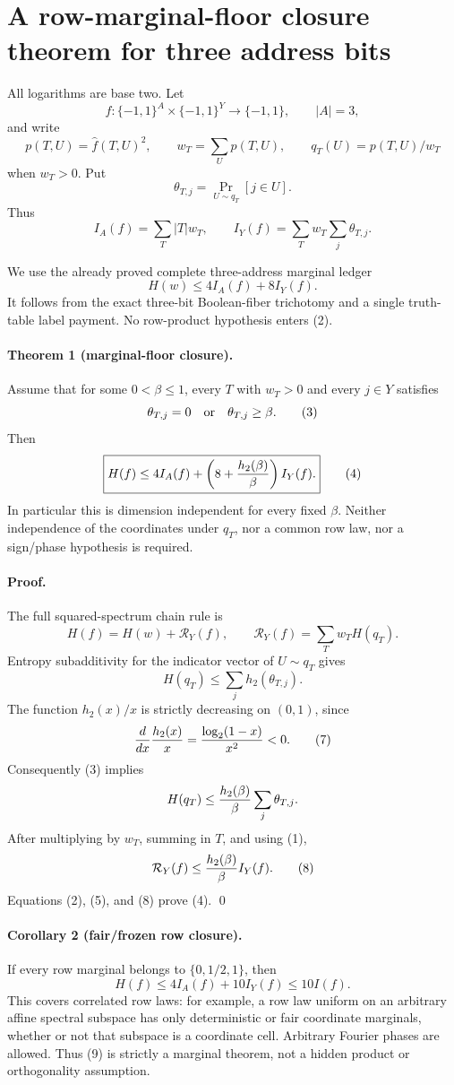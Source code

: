 \section*{A row-marginal-floor closure theorem for three address bits}

All logarithms are base two.  Let
\[
 f:\{-1,1\}^{A}\times\{-1,1\}^{Y}\to\{-1,1\},\qquad |A|=3,
\]
and write
\[
 p(T,U)=\widehat f(T,U)^2,\qquad
 w_T=\sum_U p(T,U),\qquad q_T(U)=p(T,U)/w_T
\]
when $w_T>0$.  Put
\[
 \theta_{T,j}=\Pr_{U\sim q_T}[j\in U].
\]
Thus
\[
 I_A(f)=\sum_T|T|w_T,
 \qquad I_Y(f)=\sum_Tw_T\sum_j\theta_{T,j}.             \tag{1}
\]

We use the already proved complete three-address marginal ledger
\[
 H(w)\le 4I_A(f)+8I_Y(f).                               \tag{2}
\]
It follows from the exact three-bit Boolean-fiber trichotomy and a single
truth-table label payment.  No row-product hypothesis enters (2).

\paragraph{Theorem 1 (marginal-floor closure).}
Assume that for some $0<\beta\le1$, every $T$ with $w_T>0$ and every
$j\in Y$ satisfies
\[
 \theta_{T,j}=0\quad\hbox{or}\quad \theta_{T,j}\ge\beta. \tag{3}
\]
Then
\[
 \boxed{
 H(f)\le4I_A(f)+\left(8+{h_2(\beta)\over\beta}\right)I_Y(f).} \tag{4}
\]
In particular this is dimension independent for every fixed $\beta$.
Neither independence of the coordinates under $q_T$, nor a common row law,
nor a sign/phase hypothesis is required.

\paragraph{Proof.}
The full squared-spectrum chain rule is
\[
 H(f)=H(w)+\mathcal R_Y(f),\qquad
 \mathcal R_Y(f)=\sum_Tw_TH(q_T).                        \tag{5}
\]
Entropy subadditivity for the indicator vector of $U\sim q_T$ gives
\[
 H(q_T)\le\sum_j h_2(\theta_{T,j}).                      \tag{6}
\]
The function $h_2(x)/x$ is strictly decreasing on $(0,1)$, since
\[
 {d\over dx}{h_2(x)\over x}={\log_2(1-x)\over x^2}<0.  \tag{7}
\]
Consequently (3) implies
\[
 H(q_T)\le {h_2(\beta)\over\beta}\sum_j\theta_{T,j}.
\]
After multiplying by $w_T$, summing in $T$, and using (1),
\[
 \mathcal R_Y(f)\le {h_2(\beta)\over\beta}I_Y(f).       \tag{8}
\]
Equations (2), (5), and (8) prove (4). \qed

\paragraph{Corollary 2 (fair/frozen row closure).}
If every row marginal belongs to $\{0,1/2,1\}$, then
\[
 \boxed{H(f)\le4I_A(f)+10I_Y(f)\le10I(f).}             \tag{9}
\]
This covers correlated row laws: for example, a row law uniform on an
arbitrary affine spectral subspace has only deterministic or fair coordinate
marginals, whether or not that subspace is a coordinate cell.  Arbitrary
Fourier phases are allowed.  Thus (9) is strictly a marginal theorem, not a
hidden product or orthogonality assumption.

